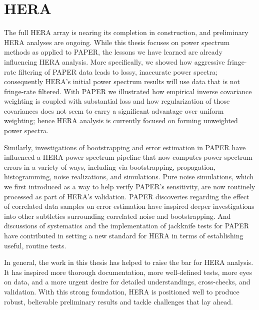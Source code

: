 \section{HERA}

The full HERA array is nearing its completion in construction, and preliminary HERA analyses are ongoing. While this thesis focuses on power spectrum methods as applied to PAPER, the lessons we have learned are already influencing HERA analysis. More specifically, we showed how aggressive fringe-rate filtering of PAPER data leads to lossy, inaccurate power spectra; consequently HERA's initial power spectrum results will use data that is not fringe-rate filtered. With PAPER we illustrated how empirical inverse covariance weighting is coupled with substantial loss and how regularization of those covariances does not seem to carry a significant advantage over uniform weighting; hence HERA analysis is currently focused on forming unweighted power spectra.

Similarly, investigations of bootstrapping and error estimation in PAPER have influenced a HERA power spectrum pipeline that now computes power spectrum errors in a variety of ways, including via bootstrapping, propagation, histogramming, noise realizations, and simulations. Pure noise simulations, which we first introduced as a way to help verify PAPER's sensitivity, are now routinely processed as part of HERA's validation. PAPER discoveries regarding the effect of correlated data samples on error estimation have inspired deeper investigations into other subtleties surrounding correlated noise and bootstrapping. And discussions of systematics and the implementation of jackknife tests for PAPER have contributed in setting a new standard for HERA in terms of establishing useful, routine tests.

In general, the work in this thesis has helped to raise the bar for HERA analysis. It has inspired more thorough documentation, more well-defined tests, more eyes on data, and a more urgent desire for detailed understandings, cross-checks, and validation. With this strong foundation, HERA is positioned well to produce robust, believable preliminary results and tackle challenges that lay ahead. 




